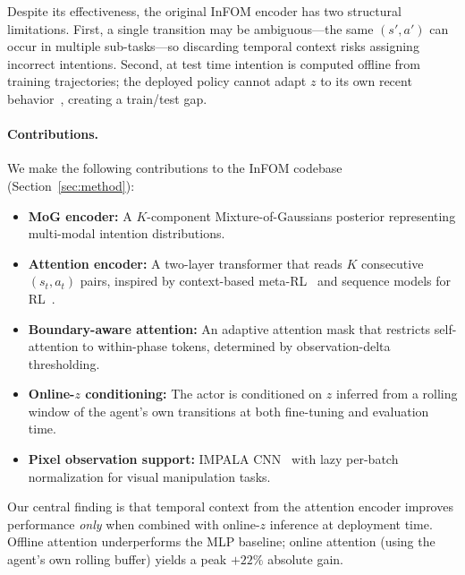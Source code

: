 \documentclass{article}
\newcommand{\base}{InFOM}
\begin{document}
Despite its effectiveness, the original \base{} encoder has two structural
limitations.
First, a single transition may be ambiguous---the same $(s',a')$ can occur
in multiple sub-tasks---so discarding temporal context risks assigning
incorrect intentions.
Second, at test time intention is computed offline from training
trajectories; the deployed policy cannot adapt $z$ to its own recent
behavior~\citep{rakelly2019pearl,duan2016rl2}, creating a train/test gap.

\paragraph{Contributions.}
We make the following contributions to the \base{} codebase
(Section~\ref{sec:method}):
\begin{itemize}\setlength\itemsep{2pt}
    \item \textbf{MoG encoder:} A $K$-component Mixture-of-Gaussians
    posterior representing multi-modal intention distributions.

    \item \textbf{Attention encoder:} A two-layer transformer that reads
    $K$ consecutive $(s_t,a_t)$ pairs, inspired by context-based
    meta-RL~\citep{rakelly2019pearl,duan2016rl2} and
    sequence models for RL~\citep{chen2021dt,reed2022gato}.

    \item \textbf{Boundary-aware attention:} An adaptive attention mask
    that restricts self-attention to within-phase tokens, determined by
    observation-delta thresholding.

    \item \textbf{Online-$z$ conditioning:} The actor is conditioned on
    $z$ inferred from a rolling window of the agent's own transitions
    at both fine-tuning and evaluation time.

    \item \textbf{Pixel observation support:} IMPALA
    CNN~\citep{espeholt2018impala} with lazy per-batch normalization
    for visual manipulation tasks.
\end{itemize}

Our central finding is that temporal context from the attention encoder
improves performance \emph{only} when combined with online-$z$ inference
at deployment time.
Offline attention underperforms the MLP baseline; online attention
(using the agent's own rolling buffer) yields a peak $+22\%$ absolute gain.
\end{document}
